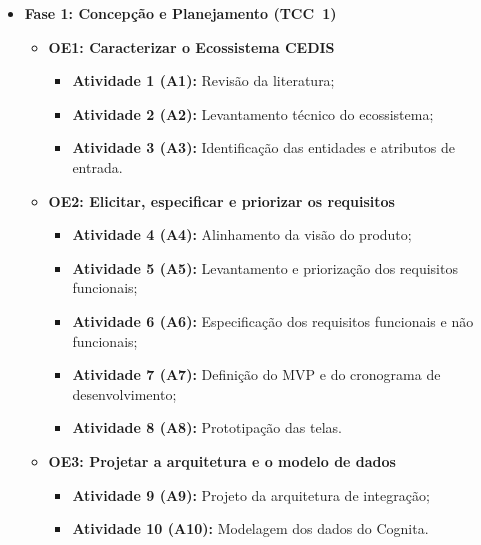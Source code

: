 \begin{itemize}
    \item \textbf{Fase 1: Concepção e Planejamento (TCC~1)}
    \begin{itemize}
        \item \textbf{OE1: Caracterizar o Ecossistema CEDIS}
        \begin{itemize}
            \item \textbf{Atividade 1 (A1):} Revisão da literatura;
            \item \textbf{Atividade 2 (A2):} Levantamento técnico do ecossistema;
            \item \textbf{Atividade 3 (A3):} Identificação das entidades e atributos de entrada.
        \end{itemize}
        \item \textbf{OE2: Elicitar, especificar e priorizar os requisitos}
        \begin{itemize}
            \item \textbf{Atividade 4 (A4):} Alinhamento da visão do produto;
            \item \textbf{Atividade 5 (A5):} Levantamento e priorização dos requisitos funcionais;
            \item \textbf{Atividade 6 (A6):} Especificação dos requisitos funcionais e não funcionais;
            \item \textbf{Atividade 7 (A7):} Definição do MVP e do cronograma de desenvolvimento;
            \item \textbf{Atividade 8 (A8):} Prototipação das telas.
        \end{itemize}
        \item \textbf{OE3: Projetar a arquitetura e o modelo de dados}
        \begin{itemize}
            \item \textbf{Atividade 9 (A9):} Projeto da arquitetura de integração;
            \item \textbf{Atividade 10 (A10):} Modelagem dos dados do Cognita.
        \end{itemize}
    \end{itemize}


\end{itemize}
